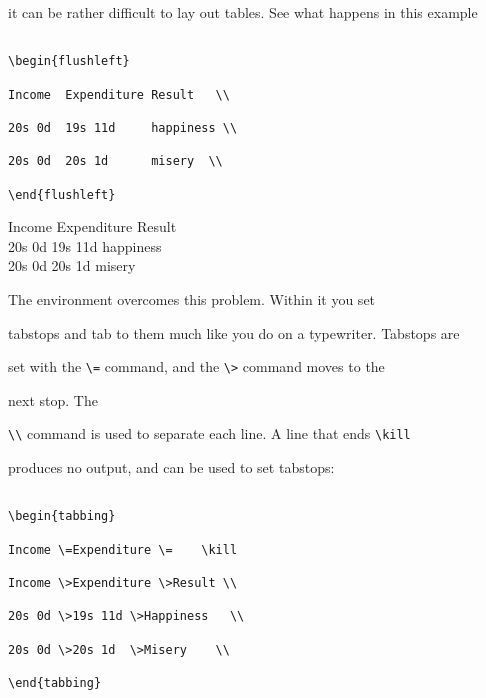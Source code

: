 it can be rather difficult to lay out tables.  See what happens in this example

\nolinebreak

\egstart

\begin{verbatim}

\begin{flushleft}

Income  Expenditure Result   \\

20s 0d  19s 11d     happiness \\

20s 0d  20s 1d      misery  \\

\end{flushleft}

\end{verbatim}

\egmid%

\begin{flushleft}

Income  Expenditure Result   \\

20s 0d  19s 11d     happiness \\

20s 0d  20s 1d      misery  \\

\end{flushleft}

\egend



The  environment overcomes this problem. Within it you set

tabstops and tab to them much like you do on a typewriter.  Tabstops are

set with the \verb|\=| command, and the \verb|\>| command moves to the

next stop.  The

\verb|\\| command is used to separate each line.  A line that ends \verb|\kill|

produces no output, and can be used to set tabstops:

\nolinebreak

\egstart

\begin{verbatim}

\begin{tabbing}

Income \=Expenditure \=    \kill

Income \>Expenditure \>Result \\

20s 0d \>19s 11d \>Happiness   \\

20s 0d \>20s 1d  \>Misery    \\

\end{tabbing}

\end{verbatim}

